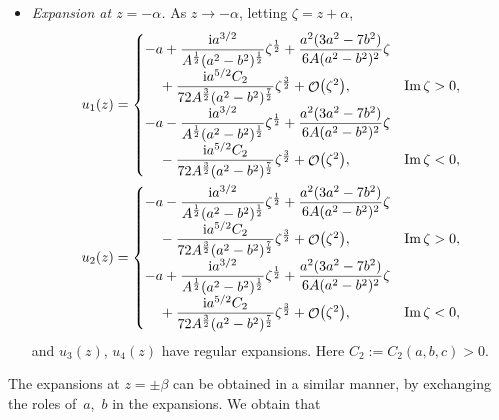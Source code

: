 \documentclass[10pt,a4paper]{amsart}
\DeclareMathOperator{\OO}{\mathcal{O}}
\numberwithin{equation}{section}
\begin{document}
\begin{itemize}
 \item \textit{Expansion at $z= - \alpha$.}
 As $z\to -\alpha$, letting $\zeta = z+\alpha$,
 \begin{align*}
 &u_1(z)=
 \begin{cases}
 -a +\dfrac{{\rm i}a^{3/2}}{A^{\frac{1}{2}}(a^2-b^2)^{\frac{1}{2}}}\zeta^{\frac{1}{2}} + \dfrac{a^2(3a^2-7b^2)}{6A(a^2-b^2)^2} \zeta &\\
 \quad{} + \dfrac{{\rm i}a^{5/2}C_2}{72A^{\frac{3}{2}}(a^2-b^2)^{\frac{7}{2}}}\zeta^{\frac{3}{2}} + \OO\bigl(\zeta^2\bigr), & \operatorname{Im} \zeta >0,\\[2mm]
 -a -\dfrac{{\rm i}a^{3/2}}{A^{\frac{1}{2}}(a^2-b^2)^{\frac{1}{2}}}\zeta^{\frac{1}{2}} + \dfrac{a^2(3a^2-7b^2)}{6A(a^2-b^2)^2} \zeta &\\
 \quad{} - \dfrac{{\rm i}a^{5/2}C_2}{72A^{\frac{3}{2}}(a^2-b^2)^{\frac{7}{2}}}\zeta^{\frac{3}{2}} + \OO\bigl(\zeta^2\bigr), &\operatorname{Im} \zeta <0,
 \end{cases}\\
 &u_2(z)=
 \begin{cases}
 -a -\dfrac{{\rm i}a^{3/2}}{A^{\frac{1}{2}}(a^2-b^2)^{\frac{1}{2}}}\zeta^{\frac{1}{2}} + \dfrac{a^2(3a^2-7b^2)}{6A(a^2-b^2)^2} \zeta &\\
 \quad{} - \dfrac{{\rm i}a^{5/2}C_2}{72A^{\frac{3}{2}}(a^2-b^2)^{\frac{7}{2}}}\zeta^{\frac{3}{2}} + \OO\bigl(\zeta^2\bigr), & \operatorname{Im} \zeta >0,\\[2mm]
 -a +\dfrac{{\rm i}a^{3/2}}{A^{\frac{1}{2}}(a^2-b^2)^{\frac{1}{2}}}\zeta^{\frac{1}{2}} + \dfrac{a^2(3a^2-7b^2)}{6A(a^2-b^2)^2} \zeta & \\
 \quad{}+ \dfrac{{\rm i}a^{5/2}C_2}{72A^{\frac{3}{2}}(a^2-b^2)^{\frac{7}{2}}}\zeta^{\frac{3}{2}} + \OO\bigl(\zeta^2\bigr), &\operatorname{Im}\zeta <0,
 \end{cases}
 \end{align*}
 and $u_3(z)$, $u_4(z)$ have regular expansions. Here
$C_2:=C_2(a,b,c)>0$.
 \end{itemize}
 The expansions at $z=\pm \beta$ can be obtained in a similar manner, by exchanging the roles of~$a$,~$b$ in the expansions. We obtain that
\end{document}
